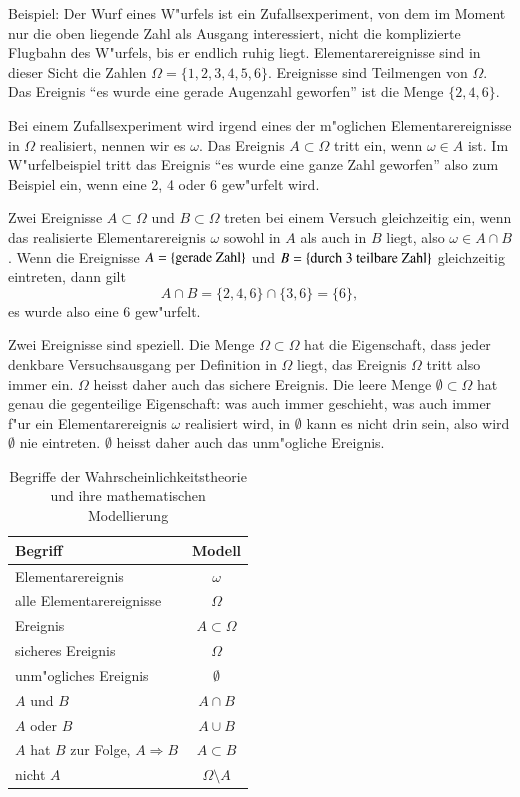 Beispiel: Der Wurf eines W"urfels ist ein Zufallsexperiment, von dem im
Moment nur die oben liegende Zahl als Ausgang interessiert, nicht die 
komplizierte Flugbahn des W"urfels, bis er endlich ruhig liegt.
Elementarereignisse sind in dieser Sicht die Zahlen
$\Omega = \{1, 2, 3, 4, 5, 6\}$.
Ereignisse sind Teilmengen von $\Omega$. Das Ereignis
``es wurde eine gerade Augenzahl geworfen'' ist die Menge $\{2, 4, 6\}$.

Bei einem Zufallsexperiment
wird irgend eines der m"oglichen
Elementarereignisse in $\Omega$ realisiert, nennen wir es $\omega$.
Das Ereignis $A\subset\Omega$
tritt ein, wenn $\omega\in A$ ist. Im W"urfelbeispiel tritt das Ereignis
``es wurde eine ganze Zahl geworfen'' also zum Beispiel ein, wenn eine
2, 4 oder 6 gew"urfelt wird.

Zwei Ereignisse $A\subset\Omega$ und $B\subset\Omega$ treten bei einem
Versuch gleichzeitig
ein, wenn das realisierte Elementarereignis
$\omega$ sowohl in $A$ als auch in $B$ liegt, also $\omega\in A\cap B$.
Wenn die Ereignisse $A=\{\hbox{gerade Zahl}\}$ und
$B=\{\hbox{durch $3$ teilbare Zahl}\}$ gleichzeitig eintreten, dann
gilt
\[
A\cap B = \{2, 4, 6\} \cap \{3, 6\} = \{6\},
\]
es wurde also eine $6$ gew"urfelt.

Zwei Ereignisse sind speziell.
Die Menge $\Omega\subset\Omega$ hat die Eigenschaft, dass jeder denkbare
Versuchsausgang per Definition in $\Omega$ liegt, das Ereignis $\Omega$
tritt also immer ein. $\Omega$ heisst daher auch das sichere Ereignis.
Die leere Menge $\emptyset\subset\Omega$ hat genau die gegenteilige
Eigenschaft: was auch immer geschieht, was auch immer f"ur ein 
Elementarereignis $\omega$ realisiert wird, in $\emptyset$ kann es
nicht drin sein, also wird $\emptyset$ nie eintreten. $\emptyset$
heisst daher auch das unm"ogliche
Ereignis.

\begin{table}
\begin{center}
\begin{tabular}{|l|c|}
\hline
Begriff&Modell\\
\hline
Elementarereignis&$\omega$\\
alle Elementarereignisse&$\Omega$\\
Ereignis&$A\subset\Omega$\\
sicheres Ereignis&$\Omega$\\
unm"ogliches Ereignis&$\emptyset$\\
$A$ und $B$&$A\cap B$\\
$A$ oder $B$&$A\cup B$\\
$A$ hat $B$ zur Folge, $A\Rightarrow B$&$A\subset B$\\
nicht $A$&$\Omega\setminus A$\\
\hline
\end{tabular}
\end{center}
\caption{Begriffe der Wahrscheinlichkeitstheorie und ihre mathematischen
Modellierung\label{begriffe-zusammenfassung}}
\end{table}

